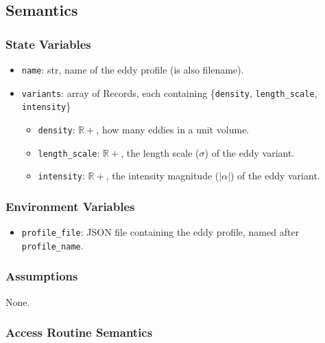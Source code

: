 \documentclass[12pt, titlepage]{article}
\begin{document}
\subsection{Semantics}

\subsubsection{State Variables}
\begin{itemize}
  \item \texttt{name}: str, name of the eddy profile (is also filename).
  \item \texttt{variants}: array of Records, each containing \{\texttt{density}, \texttt{length\_scale}, \texttt{intensity}\}
  \begin{itemize}
    \item \texttt{density}: $\mathbb{R+}$, how many eddies in a unit volume.
    \item \texttt{length\_scale}: $\mathbb{R+}$, the length scale ($\sigma$) of the eddy variant.
    \item \texttt{intensity}: $\mathbb{R+}$, the intensity magnitude ($|\alpha|$) of the eddy variant.
  \end{itemize}
  
\end{itemize}

\subsubsection{Environment Variables}
\begin{itemize}
  \item \texttt{profile\_file}: JSON file containing the eddy profile, named after \texttt{profile\_name}.
\end{itemize}

\subsubsection{Assumptions}
None.

\subsubsection{Access Routine Semantics}
\end{document}
